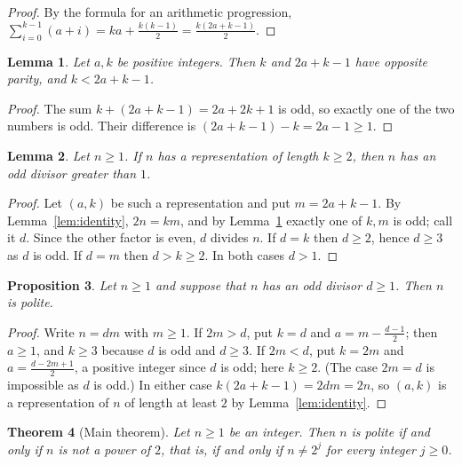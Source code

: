 \documentclass[11pt]{amsart}
\newtheorem{theorem}{Theorem}[section]
\newtheorem{lemma}[theorem]{Lemma}
\newtheorem{proposition}[theorem]{Proposition}
\theoremstyle{definition}
\theoremstyle{remark}
\begin{document}
\begin{proof}
By the formula for an arithmetic progression,
$\sum_{i=0}^{k-1}(a+i)=ka+\frac{k(k-1)}{2}=\frac{k(2a+k-1)}{2}$.
\end{proof}

\begin{lemma}\label{lem:parity}
Let $a,k$ be positive integers. Then $k$ and $2a+k-1$ have opposite parity,
and $k<2a+k-1$.
\end{lemma}

\begin{proof}
The sum $k+(2a+k-1)=2a+2k+1$ is odd, so exactly one of the two numbers is
odd. Their difference is $(2a+k-1)-k=2a-1\ge 1$.
\end{proof}

\begin{lemma}\label{lem:nec}
Let $n\ge 1$. If $n$ has a representation of length $k\ge 2$, then $n$ has an
odd divisor greater than $1$.
\end{lemma}

\begin{proof}
Let $(a,k)$ be such a representation and put $m=2a+k-1$. By
Lemma~\ref{lem:identity}, $2n=km$, and by Lemma~\ref{lem:parity} exactly one of
$k,m$ is odd; call it $d$. Since the other factor is even, $d$ divides $n$. If
$d=k$ then $d\ge 2$, hence $d\ge 3$ as $d$ is odd. If $d=m$ then $d>k\ge 2$.
In both cases $d>1$.
\end{proof}

\begin{proposition}\label{prop:suff}
Let $n\ge 1$ and suppose that $n$ has an odd divisor $d\ge 1$. Then $n$ is
polite.
\end{proposition}

\begin{proof}
Write $n=dm$ with $m\ge 1$. If $2m>d$, put $k=d$ and $a=m-\frac{d-1}{2}$; then
$a\ge 1$, and $k\ge 3$ because $d$ is odd and $d\ge 3$. If $2m<d$, put $k=2m$
and $a=\frac{d-2m+1}{2}$, a positive integer since $d$ is odd; here $k\ge 2$.
(The case $2m=d$ is impossible as $d$ is odd.) In either case
$k(2a+k-1)=2dm=2n$, so $(a,k)$ is a representation of $n$ of length at least
$2$ by Lemma~\ref{lem:identity}.
\end{proof}

\begin{theorem}[Main theorem]\label{thm:main}
Let $n\ge 1$ be an integer. Then $n$ is polite if and only if $n$ is not a
power of $2$, that is, if and only if $n\ne 2^{j}$ for every integer $j\ge 0$.
\end{theorem}
\end{document}
